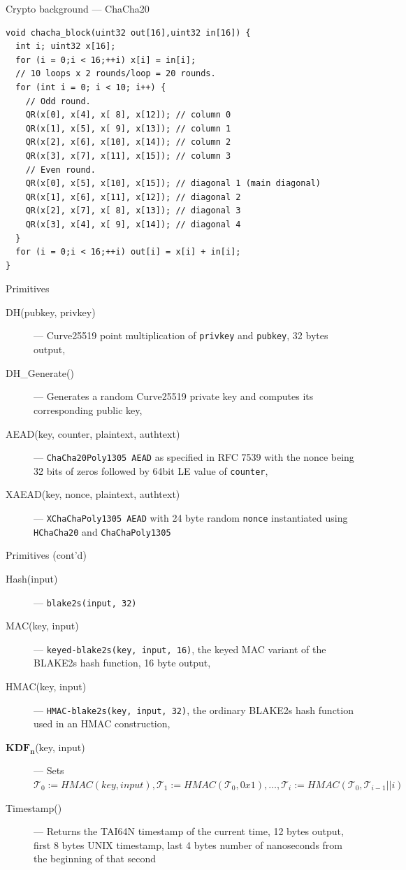 \documentclass[xcolor=table]{beamer}
\begin{document}
    \begin{frame}[fragile]{Crypto background --- ChaCha20}
        \begin{verbatim}
void chacha_block(uint32 out[16],uint32 in[16]) {
  int i; uint32 x[16];
  for (i = 0;i < 16;++i) x[i] = in[i];
  // 10 loops x 2 rounds/loop = 20 rounds.
  for (int i = 0; i < 10; i++) {
    // Odd round.
    QR(x[0], x[4], x[ 8], x[12]); // column 0
    QR(x[1], x[5], x[ 9], x[13]); // column 1
    QR(x[2], x[6], x[10], x[14]); // column 2
    QR(x[3], x[7], x[11], x[15]); // column 3
    // Even round.
    QR(x[0], x[5], x[10], x[15]); // diagonal 1 (main diagonal)
    QR(x[1], x[6], x[11], x[12]); // diagonal 2
    QR(x[2], x[7], x[ 8], x[13]); // diagonal 3
    QR(x[3], x[4], x[ 9], x[14]); // diagonal 4
  }
  for (i = 0;i < 16;++i) out[i] = x[i] + in[i];
}
        \end{verbatim}
    \end{frame}

    \begin{frame}{Primitives}
    \begin{description}
        \item[DH(pubkey, privkey)] --- Curve25519 point multiplication of \texttt{privkey} and \texttt{pubkey}, 32 bytes output,
        \item[DH\_Generate()] --- Generates a random Curve25519 private key and computes its corresponding public key,
        \item[AEAD(key, counter, plaintext, authtext)] --- \texttt{ChaCha20Poly1305 AEAD} as specified in RFC 7539 with the nonce being 32 bits of zeros followed by 64bit LE value of \texttt{counter},
        \item[XAEAD(key, nonce, plaintext, authtext)] --- \texttt{XChaChaPoly1305 AEAD} with 24 byte random \texttt{nonce} instantiated using \texttt{HChaCha20} and \texttt{ChaChaPoly1305}
    \end{description}
    \end{frame}

    \begin{frame}{Primitives (cont'd)}
        \begin{description}
            \item[Hash(input)] --- \texttt{blake2s(input, 32)}
            \item[MAC(key, input)] --- \texttt{keyed-blake2s(key, input, 16)}, the keyed MAC variant of the BLAKE2s hash function, 16 byte output,
            \item[HMAC(key, input)] --- \texttt{HMAC-blake2s(key, input, 32)}, the ordinary BLAKE2s hash function used in an HMAC construction,
            \item[$\mathbf{KDF_n}$(key, input)] --- Sets \(\mathcal{T}_0 := HMAC(key, input), \mathcal{T}_1 := HMAC(\mathcal{T}_0, 0x1), \ldots, \mathcal{T}_i := HMAC(\mathcal{T}_0, \mathcal{T}_{i - 1} || i)\)
            \item[Timestamp()] --- Returns the TAI64N timestamp of the current time, 12 bytes output, first 8 bytes UNIX timestamp, last 4 bytes number of nanoseconds from the beginning of that second
        \end{description}
    \end{frame}
\end{document}
